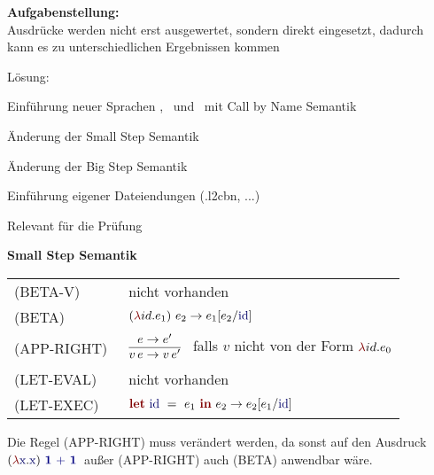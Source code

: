 {
  \textbf{Aufgabenstellung:}\\[2mm]
  Ausdrücke werden nicht erst ausgewertet, sondern direkt eingesetzt,
  dadurch kann es zu unterschiedlichen Ergebnissen kommen

  {
    \begin{itemgroup}{Lösung:}
      \item Einführung neuer Sprachen \LZEROCBN, \LONECBN\ und \LTWOCBN\ mit Call by Name Semantik
      \item Änderung der Small Step Semantik
      \item Änderung der Big Step Semantik
      \item Einführung eigener Dateiendungen (.l2cbn, ...)
      \item Relevant für die Prüfung \glqq \TPONE \grqq
    \end{itemgroup}
  }
}


{
  {\bf Small Step Semantik}\\[5mm]
  \begin{tabular}{ll}
     \mbox{(BETA-V)}      & nicht vorhanden \\[3mm]
     \mbox{(BETA)}        & $\ExprApplication{\Parenthesis{\ExprLambda{id}{}{e_1}}}{e_2} \to
                                               e_1[e_2/\ExprIdentifier{id}]$ \\[3mm]
     \mbox{(APP-RIGHT)\ } & $\smallsteprule{e \to e'}
                              {v\,e \to v\,e'}$ \ 
                              falls ${v}$ nicht von der Form $\ExprLambda{id}{}{e_0}$ \\[5mm]
     \mbox{(LET-EVAL)\  } & nicht vorhanden \\[3mm]
     \mbox{(LET-EXEC)}    & $\ExprLet{\ExprIdentifier{id}}{}{e_1}{e_2} \to
                                      e_2[e_1/\ExprIdentifier{id}]$ \\[3mm]
  \end{tabular}

  {
    Die Regel (APP-RIGHT) muss verändert werden, da sonst auf den Ausdruck \glqq
    $\ExprApplication{\Parenthesis{\ExprLambda{\ExprIdentifier{x}}{}{\ExprIdentifier{x}}}}
    {\ExprInfixOperation{\ExprBinaryOperator{+}}{\ExprConstant{1}}{\ExprConstant{1}}}$\grqq\ 
    außer (APP-RIGHT) auch (BETA) anwendbar wäre.
  }
}


